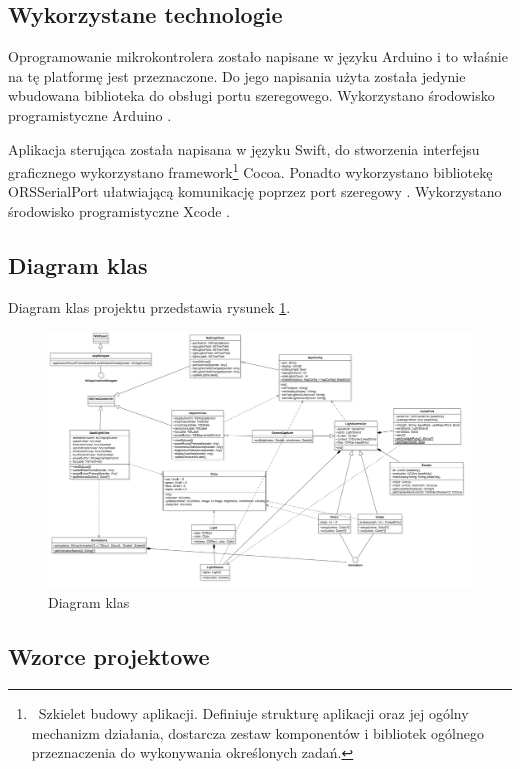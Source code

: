 \documentclass[12pt]{report}
\begin{document}
\subsection{Wykorzystane technologie}

Oprogramowanie mikrokontrolera zostało napisane w języku Arduino i to właśnie na tę platformę jest przeznaczone. Do jego napisania użyta została jedynie wbudowana biblioteka do obsługi portu szeregowego. Wykorzystano środowisko programistyczne Arduino \cite{arduinoide}.

Aplikacja sterująca została napisana w języku Swift, do stworzenia interfejsu graficznego wykorzystano framework\footnote{~Szkielet budowy aplikacji. Definiuje strukturę aplikacji oraz jej ogólny mechanizm działania, dostarcza zestaw komponentów i bibliotek ogólnego przeznaczenia do wykonywania określonych zadań.} Cocoa. Ponadto wykorzystano bibliotekę\\ORSSerialPort ułatwiającą komunikację poprzez port szeregowy \cite{orsserialport}. Wykorzystano środowisko programistyczne Xcode \cite{xcode}.

\subsection{Diagram klas}

Diagram klas projektu przedstawia rysunek \ref{diagram}.

\begin{figure}[h]
\centering
\includegraphics[angle=90,height=\textheight]{class-diagram.png}
\caption{Diagram klas}
\label{diagram}
\end{figure}

\vfill
\clearpage

\subsection{Wzorce projektowe}
\end{document}
